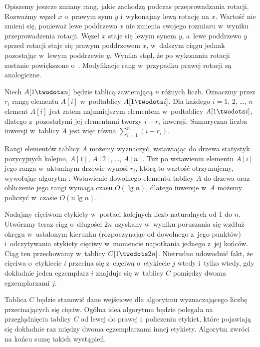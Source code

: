 Opiszemy jeszcze zmiany rang, jakie zachodzą podczas przeprowadzania rotacji.
Rozważmy węzeł $x$ o~prawym synu $y$ i~wykonajmy lewą rotację na $x$.
Wartość  nie zmieni się, ponieważ lewe poddrzewo $x$ nie zmienia swojego rozmiaru w~wyniku przeprowadzenia rotacji.
Węzeł $x$ staje się lewym synem $y$, a~lewe poddrzewo $y$ sprzed rotacji staje się prawym poddrzewem $x$, w~dalszym ciągu jednak pozostając w~lewym poddrzewie $y$.
Wynika stąd, że po wykonaniu rotacji  zostanie powiększone o~.
Modyfikacje rang w~przypadku prawej rotacji są analogiczne.

\exercise %
Niech $A[1\twodots n]$ będzie tablicą zawierającą $n$ różnych liczb.
Oznaczmy przez $r_i$ rangę elementu $A[i]$ w~podtablicy $A[1\twodots i]$.
Dla każdego $i=1$, 2, \dots, $n$ element $A[i]$ jest zatem  najmniejszym elementem w~podtablicy $A[1\twodots i]$, dlatego z~pozostałymi jej elementami tworzy $i-r_i$ inwersji.
Sumaryczna liczba inwersji w~tablicy $A$ jest więc równa $\sum_{i=1}^n(i-r_i)$.

Rangi elementów tablicy $A$ możemy wyznaczyć, wstawiając do drzewa statystyk pozycyjnych kolejno, $A[1]$, $A[2]$, \dots, $A[n]$.
Tuż po wstawieniu elementu $A[i]$ jego ranga w~aktualnym drzewie wynosi $r_i$, którą to wartość otrzymujemy, wywołując algorytm .
Wstawienie dowolnego elementu tablicy $A$ do drzewa oraz obliczenie jego rangi wymaga czasu $O(\lg n)$, dlatego inwersje w~$A$ możemy policzyć w~czasie $O(n\lg n)$.

\exercise %
Nadajmy cięciwom etykiety w~postaci kolejnych liczb naturalnych od 1 do $n$.
Utwórzmy teraz ciąg o~długości $2n$ uzyskany w~wyniku poruszania się wzdłuż okręgu w~ustalonym kierunku (rozpoczynając od dowolnego z~jego punktów) i~odczytywania etykiety cięciwy w~momencie napotkania jednego z~jej końców.
Ciąg ten przechowamy w~tablicy $C[1\twodots2n]$.
Nietrudno udowodnić fakt, że cięciwa o~etykiecie $i$ przecina się z~cięciwą o~etykiecie $j$ wtedy i~tylko wtedy, gdy dokładnie jeden egzemplarz $i$ znajduje się w~tablicy $C$ pomiędzy dwoma egzemplarzami $j$.

Tablica $C$ będzie stanowić dane wejściowe dla algorytmu  wyznaczającego liczbę przecinających się cięciw.
Ogólna idea algorytmu będzie polegała na przeglądnięciu tablicy $C$ od lewej do prawej i~policzeniu etykiet, które pojawiają się dokładnie raz między dwoma egzemplarzami innej etykiety.
Algorytm zwróci na końcu sumę takich wystąpień.

